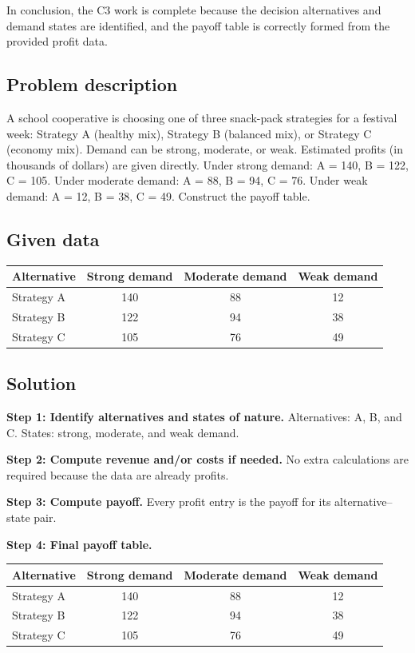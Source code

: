 \begin{ExamProblems}
		In conclusion, the C3 work is complete because the decision alternatives and demand states are identified, and the payoff table is correctly formed from the provided profit data.
		
		\item
		\subsection*{Problem description}
		A school cooperative is choosing one of three snack-pack strategies for a festival week: Strategy A (healthy mix),
		Strategy B (balanced mix), or Strategy C (economy mix). Demand can be strong, moderate, or weak.
		Estimated profits (in thousands of dollars) are given directly. Under strong demand: A = 140, B = 122, C = 105.
		Under moderate demand: A = 88, B = 94, C = 76. Under weak demand: A = 12, B = 38, C = 49.
		Construct the payoff table.
		
		\subsection*{Given data}
		\begin{center}
			\begin{tabular}{l c c c}
				\toprule
				Alternative & Strong demand & Moderate demand & Weak demand \\
				\midrule
				Strategy A & 140 & 88 & 12 \\
				Strategy B & 122 & 94 & 38 \\
				Strategy C & 105 & 76 & 49 \\
				\bottomrule
			\end{tabular}
		\end{center}
		
		\subsection*{Solution}
		\textbf{Step 1: Identify alternatives and states of nature.} Alternatives: A, B, and C. States: strong, moderate, and weak demand.
		
		\textbf{Step 2: Compute revenue and/or costs if needed.} No extra calculations are required because the data are already profits.
		
		\textbf{Step 3: Compute payoff.} Every profit entry is the payoff for its alternative--state pair.
		
		\textbf{Step 4: Final payoff table.}
		\begin{center}
			\begin{tabular}{l c c c}
				\toprule
				Alternative & Strong demand & Moderate demand & Weak demand \\
				\midrule
				Strategy A & 140 & 88 & 12 \\
				Strategy B & 122 & 94 & 38 \\
				Strategy C & 105 & 76 & 49 \\
				\bottomrule
			\end{tabular}
		\end{center}
		

\end{ExamProblems}
